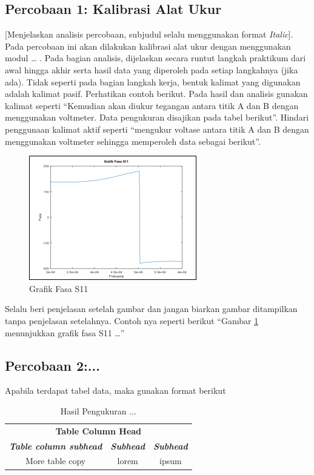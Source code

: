 \documentclass[conference]{IEEEtran}
\begin{document}
\subsection{Percobaan 1: Kalibrasi Alat Ukur}

[Menjelaskan analisis percobaan, subjudul selalu menggunakan format \textit{Italic}].\\

Pada percobaan ini akan dilakukan kalibrasi alat ukur dengan menggunakan modul … . Pada bagian analisis, dijelaskan secara runtut langkah praktikum dari awal hingga akhir serta hasil data yang diperoleh pada setiap langkahnya (jika ada). Tidak seperti pada bagian langkah kerja, bentuk kalimat yang digunakan adalah kalimat pasif. Perhatikan contoh berikut. Pada hasil dan analisis gunakan kalimat seperti “Kemudian akan diukur tegangan antara titik A dan B dengan menggunakan voltmeter. Data pengukuran disajikan pada tabel berikut”. Hindari penggunaan kalimat aktif seperti “mengukur voltase antara titik A dan B dengan menggunakan voltmeter sehingga memperoleh data sebagai berikut”.

\begin{figure}[htbp]
\centerline{\includegraphics{./Figures/s11.png}}
\caption{Grafik Fasa S11}
\label{fig2}
\end{figure}
\FloatBarrier

Selalu beri penjelasan setelah gambar dan jangan biarkan gambar ditampilkan tanpa penjelasan setelahnya. Contoh nya seperti berikut “Gambar \ref{fig2} menunjukkan grafik fasa S11 …”

\subsection{Percobaan 2:...}
Apabila terdapat tabel data, maka gunakan format berikut

\begin{table}[htbp]
\caption{Hasil Pengukuran ...}
\begin{center}
\begin{tabular}{|c|c|c|}
\hline
\multicolumn{3}{|c|}{\textbf{Table Column Head}} \\
\cline{1-3} 
\textbf{\textit{Table column subhead}}& \textbf{\textit{Subhead}}& \textbf{\textit{Subhead}} \\
\hline
 More table copy & lorem & ipsum  \\
\hline
\end{tabular}
\label{tab1}
\end{center}
\end{table}
\end{document}
